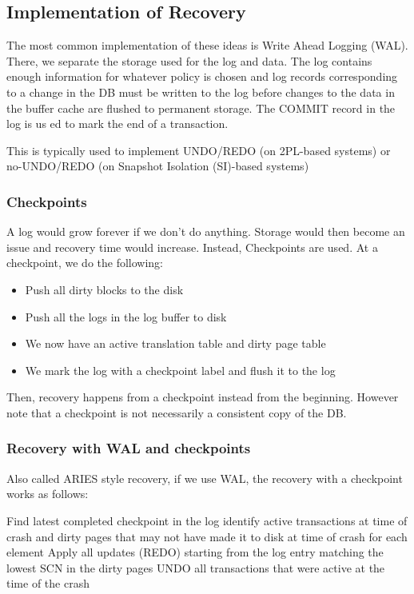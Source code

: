 \subsection{Implementation of Recovery}
The most common implementation of these ideas is Write Ahead Logging (WAL).
There, we separate the storage used for the log and data. The log contains enough information for whatever policy is chosen and log records corresponding to a change in the DB
must be written to the log before changes to the data in the buffer cache are flushed to permanent storage.
The COMMIT record in the log is us ed to mark the end of a transaction.

This is typically used to implement UNDO/REDO (on 2PL-based systems) or no-UNDO/REDO (on Snapshot Isolation (SI)-based systems)


\subsubsection{Checkpoints}
A log would grow forever if we don't do anything. Storage would then become an issue and recovery time would increase.
Instead, Checkpoints are used. At a checkpoint, we do the following:
\begin{itemize}
    \item Push all dirty blocks to the disk
    \item Push all the logs in the log buffer to disk
    \item We now have an active translation table and dirty page table
    \item We mark the log with a checkpoint label and flush it to the log
\end{itemize}
Then, recovery happens from a checkpoint instead from the beginning. However note that a checkpoint is not necessarily a consistent copy of the DB.


\subsubsection{Recovery with WAL and checkpoints}
Also called ARIES style recovery, if we use WAL, the recovery with a checkpoint works as follows:

\begin{algorithm}
    \caption{WAL checkpoint recovery}
    \begin{algorithmic}[1]
            \State Find latest completed checkpoint in the log
                \State identify active transactions at time of crash and dirty pages that may not have made it to disk at time of crash for each element
            \EndWhile
            \State Apply all updates (REDO) starting from the log entry matching the lowest SCN in the dirty pages
            \State UNDO all transactions that were active at the time of the crash
        \EndProcedure
    \end{algorithmic}
\end{algorithm}

